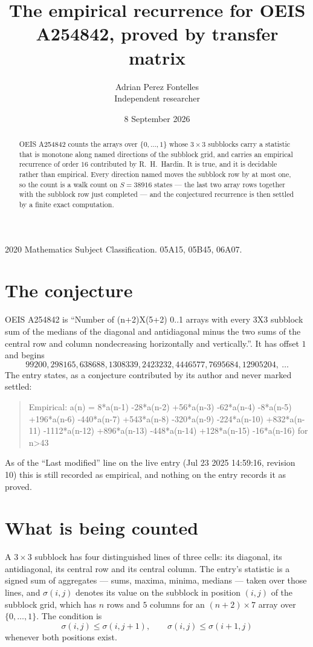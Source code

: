 \documentclass[11pt,a4paper]{article}
\title{The empirical recurrence for OEIS A254842, proved by transfer matrix}
\author{Adrian Perez Fontelles\\ \small Independent researcher}
\date{8 September 2026}
\theoremstyle{plain}
\theoremstyle{definition}
\begin{document}
\maketitle

\begin{abstract}
OEIS A254842 counts the arrays over $\{0,\dots,1\}$ whose $3\times3$ subblocks carry a
statistic that is monotone along named directions of the subblock grid, and carries an
empirical recurrence of order $16$ contributed by R.~H.~Hardin. It is true, and it is
decidable rather than empirical. Every direction named moves the subblock row by at most one,
so the count is a walk count on $S=38916$ states --- the last two array rows together with the
subblock row just completed --- and the conjectured recurrence is then settled by a finite
exact computation.
\end{abstract}

\noindent\small 2020 Mathematics Subject Classification. 05A15, 05B45, 06A07.\normalsize

\section{The conjecture}

OEIS A254842 is ``Number of (n+2)X(5+2) 0..1 arrays with every 3X3 subblock sum of the medians of the diagonal and antidiagonal minus the two sums of the central row and column nondecreasing horizontally and vertically.''. It has offset $1$ and begins
\[
99200, 298165, 638688, 1308339, 2423232, 4446577, 7695684, 12905204,\ \dots
\]
The entry states, as a conjecture contributed by its author and never marked settled:
\begin{quote}
Empirical: a(n) = 8*a(n-1) -28*a(n-2) +56*a(n-3) -62*a(n-4) -8*a(n-5) +196*a(n-6) -440*a(n-7) +543*a(n-8) -320*a(n-9) -224*a(n-10) +832*a(n-11) -1112*a(n-12) +896*a(n-13) -448*a(n-14) +128*a(n-15) -16*a(n-16) for n>43
\end{quote}
As of the ``Last modified'' line on the live entry (Jul 23 2025 14:59:16, revision 10) this is still
recorded as empirical, and nothing on the entry records it as proved.

\section{What is being counted}

A $3\times3$ subblock has four distinguished lines of three cells: its diagonal, its
antidiagonal, its central row and its central column. The entry's statistic is a signed sum of
aggregates --- sums, maxima, minima, medians --- taken over those lines, and $\sigma(i,j)$
denotes its value on the subblock in position $(i,j)$ of the subblock grid, which has $n$ rows
and $5$ columns for an $(n+2)\times7$ array over $\{0,\dots,1\}$. The condition is
\[
\sigma(i,j)\le\sigma(i,j+1),\qquad \sigma(i,j)\le\sigma(i+1,j)
\]
whenever both positions exist.
\end{document}
